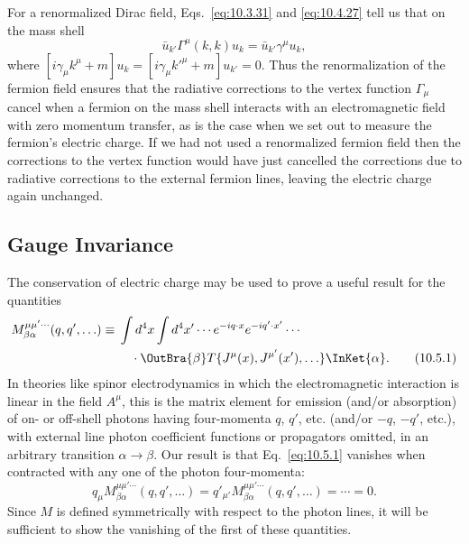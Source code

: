 
For a renormalized Dirac field, Eqs.~\eqref{eq:10.3.31} and
\eqref{eq:10.4.27} tell us that on the mass shell
\begin{equation}
  \bar u_{k'}\Gamma^\mu(k,k)u_k=\bar u_{k'}\gamma^\mu u_k,
  \tag{10.4.28}\label{eq:10.4.28}
\end{equation}
where $[i\gamma_\mu k^\mu+m]u_k=[i\gamma_\mu k'^\mu+m]u_{k'}=0$.
Thus the renormalization of the fermion field ensures that the radiative
corrections to the vertex function $\Gamma_\mu$ cancel when a fermion on the
mass shell interacts with an electromagnetic field with zero momentum
transfer, as is the case when we set out to measure the fermion's electric
charge. If we had not used a renormalized fermion field then the corrections
to the vertex function would have just cancelled the corrections due to
radiative corrections to the external fermion lines, leaving the electric
charge again unchanged.

\subsection{Gauge Invariance}

The conservation of electric charge may be used to prove a useful result for
the quantities
\begin{align}
  M^{\mu\mu'\cdots}_{\beta\alpha}(q,q',\ldots)
  \equiv{}&\int d^4x\int d^4x'\cdots
  e^{-iq\cdot x}e^{-iq'\cdot x'}\cdots \notag\\
  &\quad\cdot
  \OutBra{\beta}
  T\{J^\mu(x),J^{\mu'}(x'),\ldots\}
  \InKet{\alpha}.
  \tag{10.5.1}\label{eq:10.5.1}
\end{align}
In theories like spinor electrodynamics in which the electromagnetic
interaction is linear in the field $A^\mu$, this is the matrix element for
emission (and/or absorption) of on- or off-shell photons having four-momenta
$q$, $q'$, etc. (and/or $-q$, $-q'$, etc.), with external line photon
coefficient functions or propagators omitted, in an arbitrary transition
$\alpha\to\beta$. Our result is that Eq.~\eqref{eq:10.5.1} vanishes when
contracted with any one of the photon four-momenta:
\begin{equation}
  q_\mu M^{\mu\mu'\cdots}_{\beta\alpha}(q,q',\ldots)
  =q'_{\mu'}M^{\mu\mu'\cdots}_{\beta\alpha}(q,q',\ldots)
  =\cdots=0.
  \tag{10.5.2}\label{eq:10.5.2}
\end{equation}
Since $M$ is defined symmetrically with respect to the photon lines, it will
be sufficient to show the vanishing of the first of these quantities.

